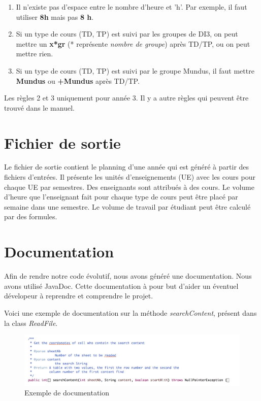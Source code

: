 \documentclass{polytech/polytech}
\begin{document}
	\begin{enumerate}
		\item Il n'existe pas d'espace entre le nombre d'heure et 'h'. Par exemple, il faut utiliser \textbf{8h} mais pas \textbf{8 h}.

		\item Si un type de cours (TD, TP) est suivi par les groupes de DI3, on peut mettre un \textbf{x*gr} (* représente \textit{nombre de groupe}) après
		TD/TP, ou on peut mettre rien.

		\item Si un type de cours (TD, TP) est suivi par le groupe Mundus, il faut mettre \textbf{Mundus} ou \textbf{+Mundus} après TD/TP.

	\end{enumerate}

	Les règles 2 et 3 uniquement pour année 3. Il y a autre règles qui peuvent être trouvé dans le manuel.

	\section{Fichier de sortie}

	Le fichier de sortie contient le planning d'une année qui est généré à partir des fichiers d'entrées.
	Il présente les unités d'enseignements (UE) avec les cours pour chaque UE par semestres.
	Des enseignants sont attribués à des cours. Le volume d'heure que l'enseignant fait pour chaque type de cours peut être placé par semaine dans une semestre.
	Le volume de travail par étudiant peut être calculé par des formules.

	\section{Documentation}
	Afin de rendre notre code évolutif, nous avons généré une documentation.
	Nous avons utilisé JavaDoc.
	Cette documentation à pour but d'aider un éventuel dévelopeur à reprendre et comprendre le projet.

	Voici une exemple de documentation sur la méthode \textit{searchContent}, présent dans la class \textit{ReadFile}.

	\begin{figure}
		\caption{Exemple de documentation}
		\includegraphics[width=\textwidth]{./img/documentation.png}
	\end{figure}
\end{document}
